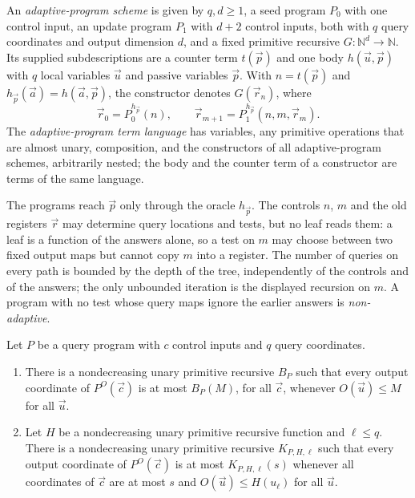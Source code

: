 \begin{definition}
An \emph{adaptive-program scheme} is given by $q,d\ge 1$, a seed program $P_0$
with one control input, an update program $P_1$ with $d+2$ control inputs, both
with $q$ query coordinates and output dimension $d$, and a fixed primitive
recursive $G\colon\mathbb{N}^d\to\mathbb{N}$. Its supplied subdescriptions are a
counter term $t(\vec p)$ and one body $h(\vec u,\vec p)$ with $q$ local
variables $\vec u$ and passive variables $\vec p$. With $n=t(\vec p)$ and
$h_{\vec p}(\vec a)=h(\vec a,\vec p)$, the constructor denotes $G(\vec r_n)$,
where
\begin{equation}
\label{obs:eq:program-recursor}
\vec r_0=P_0^{h_{\vec p}}(n),\qquad
\vec r_{m+1}=P_1^{h_{\vec p}}(n,m,\vec r_m).
\end{equation}
The \emph{adaptive-program term language} has variables, any primitive
operations that are almost unary, composition, and the constructors of all
adaptive-program schemes, arbitrarily nested; the body and the counter term of a
constructor are terms of the same language.
\end{definition}

The programs reach $\vec p$ only through the oracle $h_{\vec p}$. The controls
$n$, $m$ and the old registers $\vec r$ may determine query locations and tests,
but no leaf reads them: a leaf is a function of the answers alone, so a test on
$m$ may choose between two fixed output maps but cannot copy $m$ into a
register. The number of queries on every path is bounded by the depth of the
tree, independently of the controls and of the answers; the only unbounded
iteration is the displayed recursion on $m$. A program with no test whose query
maps ignore the earlier answers is \emph{non-adaptive}.

\begin{lemma}
\label{obs:lem:programs}
Let $P$ be a query program with $c$ control inputs and $q$ query coordinates.
\begin{enumerate}[label=(\roman*)]
\item There is a nondecreasing unary primitive recursive $B_P$ such that every
output coordinate of $P^{O}(\vec c)$ is at most $B_P(M)$, for all $\vec c$,
whenever $O(\vec u)\le M$ for all $\vec u$.
\item Let $H$ be a nondecreasing unary primitive recursive function and
$\ell\le q$. There is a nondecreasing unary primitive recursive $K_{P,H,\ell}$
such that every output coordinate of $P^{O}(\vec c)$ is at most
$K_{P,H,\ell}(s)$ whenever all coordinates of $\vec c$ are at most $s$ and
$O(\vec u)\le H(u_\ell)$ for all $\vec u$.
\end{enumerate}
\end{lemma}

